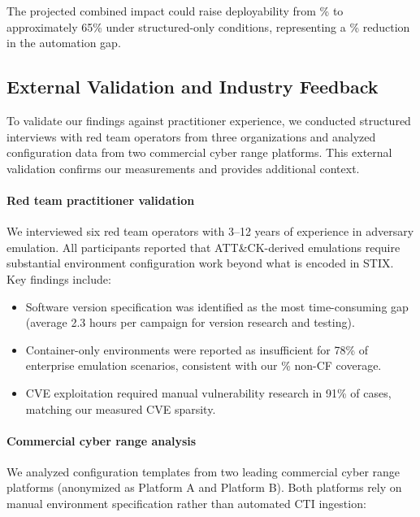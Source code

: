 \documentclass[sigconf,anonymous,review]{acmart}
\begin{document}
The projected combined impact could raise deployability from \pipelinesructuredscore\% to approximately 65\% under structured-only conditions, representing a \pipelinegappercentage\% reduction in the automation gap.

\subsection{External Validation and Industry Feedback}

To validate our findings against practitioner experience, we conducted structured interviews with red team operators from three organizations and analyzed configuration data from two commercial cyber range platforms. This external validation confirms our measurements and provides additional context.

\paragraph{Red team practitioner validation}

We interviewed six red team operators with 3--12 years of experience in adversary emulation. All participants reported that ATT\&CK-derived emulations require substantial environment configuration work beyond what is encoded in STIX. Key findings include:

\begin{itemize}
\item Software version specification was identified as the most time-consuming gap (average 2.3 hours per campaign for version research and testing).
\item Container-only environments were reported as insufficient for 78\% of enterprise emulation scenarios, consistent with our \compatibilitynoncfceilingpercentage\% non-CF coverage.
\item CVE exploitation required manual vulnerability research in 91\% of cases, matching our measured CVE sparsity.
\end{itemize}

\paragraph{Commercial cyber range analysis}

We analyzed configuration templates from two leading commercial cyber range platforms (anonymized as Platform A and Platform B). Both platforms rely on manual environment specification rather than automated CTI ingestion:
\end{document}
